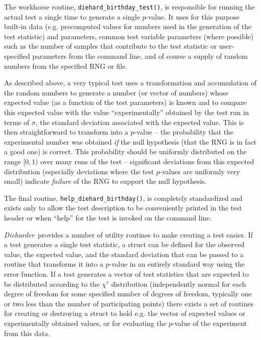 \documentclass[12pt]{book}
\newcommand{\die}{\emph{Dieharder}\ }
\begin{document}
The workhorse routine, {\tt diehard\_birthday\_test()}, is responsible for
running the actual test a single time to generate a single $p$-value.
It uses for this purpose built-in data (e.g. precomputed values for
numbers used in the generation of the test statistic) and parameters,
common test variable parameters (where possible) such as the number of
samples that contribute to the test statistic or user-specified
parameters from the command line, and of course a supply of random
numbers from the specified RNG or file.  

As described above, a very typical test uses a transformation and
accumulation of the random numbers to generate a number (or vector of
numbers) whose expected value (as a function of the test parameters) is
known and to compare this expected value with the value
``experimentally'' obtained by the test run in terms of $\sigma$, the
standard deviation associated with the expected value.  This is then
straightforward to transform into a $p$-value -- the probability that
the experimental number was obtained {\em if} the null hypothesis (that
the RNG is in fact a good one) is correct.  This probability should be
uniformly distributed on the range $[0,1)$ over many runs of the test --
significant deviations from this expected distribution (especially
deviations where the test $p$-values are uniformly very small) indicate
{\em failure} of the RNG to support the null hypothesis.

The final routine, {\tt help\_diehard\_birthday()}, is completely
standardized and exists only to allow the test description to be
conveniently printed in the test header or when ``help'' for the test is
invoked on the command line.

\die provides a number of utility routines to make creating a test
easier.  If a test generates a single test statistic, a struct can be
defined for the observed value, the expected value, and the standard
deviation that can be passed to a routine that transforms it into a
$p$-value in an entirely standard way using the error function.  If a
test generates a vector of test statistics that are expected to be
distributed according to the $\chi^s$ distribution (independently normal
for each degree of freedom for some specified number of degrees of
freedom, typically one or two less than the number of participating
points) there exists a set of routines for creating or destroying a
struct to hold e.g. the vector of expected values or experimentally
obtained values, or for evaluating the $p$-value of the experiment from
this data.
\end{document}
